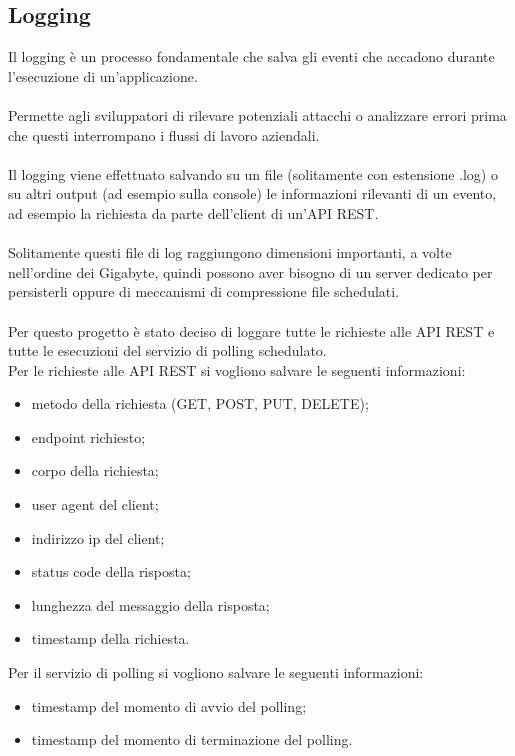 \subsection{Logging}
Il logging è un processo fondamentale che salva gli eventi che accadono durante
l'esecuzione di un'applicazione.
\\\\
Permette agli sviluppatori di rilevare potenziali attacchi o analizzare
errori prima che questi interrompano i flussi di lavoro aziendali.
\\\\
Il logging viene effettuato salvando su un file (solitamente con estensione .log) o su altri output (ad esempio sulla console) le informazioni rilevanti
di un evento, ad esempio la richiesta da parte
dell'client di un'\gls{API} \gls{REST}.
\\\\
Solitamente questi file di log raggiungono dimensioni importanti, a volte nell'ordine dei Gigabyte, quindi possono aver bisogno di
un server dedicato per persisterli oppure di meccanismi di compressione file schedulati.
\\\\
Per questo progetto è stato deciso di loggare tutte le richieste alle \gls{API} \gls{REST}
e tutte le esecuzioni del servizio di polling schedulato.
\\
Per le richieste alle \gls{API} \gls{REST} si vogliono salvare le seguenti 
informazioni:
\begin{itemize}
    \item metodo della richiesta (GET, POST, PUT, DELETE);
    \item \gls{endpoint} richiesto;
    \item corpo della richiesta;
    \item user agent del client;
    \item indirizzo ip del client;
    \item status code della risposta;
    \item lunghezza del messaggio della risposta;
    \item timestamp della richiesta.
\end{itemize}
\leavevmode\newline
Per il servizio di polling si vogliono salvare le seguenti informazioni:
\begin{itemize}
    \item timestamp del momento di avvio del polling;
    \item timestamp del momento di terminazione del polling.
\end{itemize}
